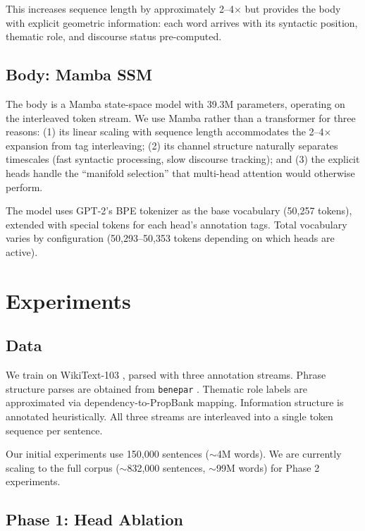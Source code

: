 \documentclass[11pt]{article}
\begin{document}
This increases sequence length by approximately 2--4$\times$ but provides 
the body with explicit geometric information: each word arrives with its 
syntactic position, thematic role, and discourse status pre-computed.

\subsection{Body: Mamba SSM}

The body is a Mamba state-space model \cite{gu2023mamba} with 39.3M 
parameters, operating on the interleaved token stream. We use Mamba rather 
than a transformer for three reasons: (1) its linear scaling with 
sequence length accommodates the 2--4$\times$ expansion from tag 
interleaving; (2) its channel structure naturally separates timescales 
(fast syntactic processing, slow discourse tracking); and (3) the 
explicit heads handle the ``manifold selection'' that multi-head attention 
would otherwise perform.

The model uses GPT-2's BPE tokenizer as the base vocabulary (50,257 tokens), 
extended with special tokens for each head's annotation tags. Total vocabulary 
varies by configuration (50,293--50,353 tokens depending on which heads are 
active).

\section{Experiments}
\label{sec:experiments}

\subsection{Data}

We train on WikiText-103 \cite{merity2017pointer}, parsed with three 
annotation streams. Phrase structure parses are obtained from 
\texttt{benepar} \cite{kitaev2019multilingual}. Thematic role labels 
are approximated via dependency-to-PropBank mapping. Information 
structure is annotated heuristically. All three streams are interleaved 
into a single token sequence per sentence.

Our initial experiments use 150,000 sentences ($\sim$4M words). We 
are currently scaling to the full corpus ($\sim$832,000 
sentences, $\sim$99M words) for Phase 2 experiments.

\subsection{Phase 1: Head Ablation}
\end{document}
